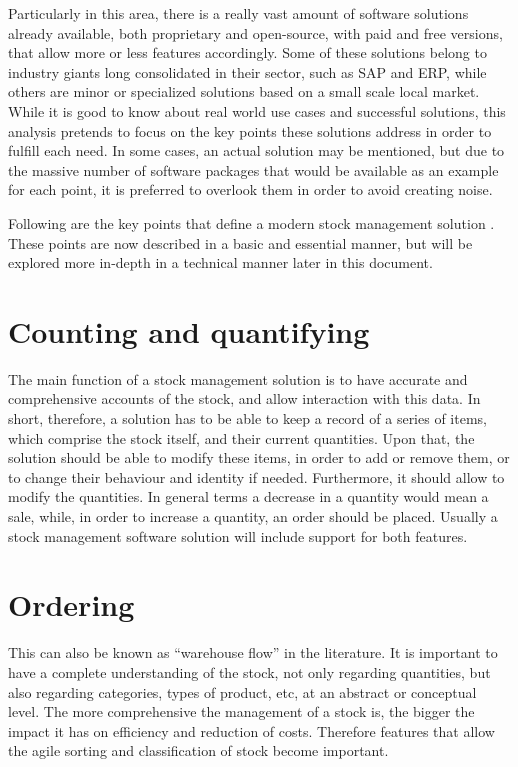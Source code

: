 Particularly in this area, there is a really vast amount of software solutions already available, both proprietary and open-source, with paid and free versions, that allow more or less features accordingly. Some of these solutions belong to industry giants long consolidated in their sector, such as SAP and ERP, while others are minor or specialized solutions based on a small scale local market.
While it is good to know about real world use cases and successful solutions, this analysis pretends to focus on the key points these solutions address in order to fulfill each need. In some cases, an actual solution may be mentioned, but due to the massive number of software packages that would be available as an example for each point, it is preferred to overlook them in order to avoid creating noise.

Following are the key points that define a modern stock management solution \cite{5}. These points are now described in a basic and essential manner, but will be explored more in-depth in a technical manner later in this document.

\section{Counting and quantifying}
The main function of a stock management solution is to have accurate and comprehensive accounts of the stock, and allow interaction with this data. In short, therefore, a solution has to be able to keep a record of a series of items, which comprise the stock itself, and their current quantities.
Upon that, the solution should be able to modify these items, in order to add or remove them, or to change their behaviour and identity if needed.
Furthermore, it should allow to modify the quantities. In general terms a decrease in a quantity would mean a sale, while, in order to increase a quantity, an order should be placed. Usually a stock management software solution will include support for both features.
\section{Ordering}
This can also be known as “warehouse flow” in the literature. It is important to have a complete understanding of the stock, not only regarding quantities, but also regarding categories, types of product, etc, at an abstract or conceptual level. The more comprehensive the management of a stock is, the bigger the impact it has on efficiency and reduction of costs. Therefore features that allow the agile sorting and classification of stock become important.

